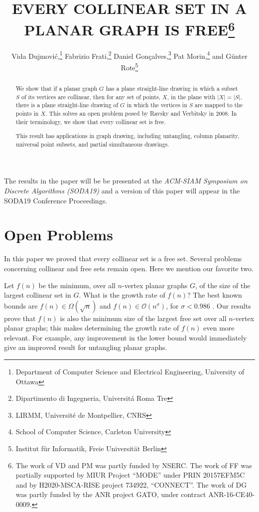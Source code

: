 \documentclass{patmorin}
\title{\MakeUppercase{Every Collinear Set in a Planar Graph Is Free}\thanks{%
    The work of VD and PM was partly funded by NSERC.
    The work of FF was 
partially supported by MIUR Project “MODE” under PRIN 20157EFM5C and by 
H2020-MSCA-RISE project 734922, “CONNECT”.
    The work of DG  was 
partly funded by the ANR project GATO, under contract
     ANR-16-CE40-0009.}}
\author{Vida Dujmovi\'c,\thanks{Department of Computer Science and Electrical Engineering, University of Ottawa}\quad
        Fabrizio Frati,\thanks{Dipartimento di Ingegneria, Universit\'a Roma Tre}\quad 
        Daniel Gon\c{c}alves,\thanks{LIRMM, Université de Montpellier, CNRS}\quad
        Pat Morin,\thanks{School of Computer Science, Carleton University}\quad 
        and G\"unter Rote\thanks{Institut f\"ur Informatik, Freie Universit\"at Berlin}}
\newif\ifSODA
\begin{document}
\begin{titlepage}
\maketitle

\begin{abstract}
  We show that if a planar graph $G$ has a plane straight-line drawing in
  which a subset $S$ of its vertices are collinear, then for any set of
  points, $X$, in the plane with $|X|=|S|$, there is a plane straight-line
  drawing of $G$ in which the vertices in $S$ are mapped to the points
  in $X$.  This solves an open problem posed by Ravsky and Verbitsky in
  2008.  In their terminology, we show that every collinear set is free.

  This result has applications in graph drawing, including untangling,
  column planarity, universal point subsets, and partial simultaneous
  drawings.
\end{abstract}
\ifSODA
\else
The results in the paper will be be presented at the \emph{ACM-SIAM
Symposium on Discrete Algorithms (SODA19)} and a version of this paper
will appear in the SODA19 Conference Proceedings.
\fi
\end{titlepage}


\tableofcontents

\newpage
{}







\section{Open Problems}

In this paper we proved that every collinear set is a free set. Several problems concerning collinear and free sets remain open. Here we mention our favorite two.

Let $f(n)$ be the minimum, over all $n$-vertex planar graphs $G$, of the size of the largest collinear set in $G$. What is the growth rate of $f(n)$? The best known bounds are $f(n)\in\Omega(\sqrt{n})$ and $f(n)\in \mathcal{O}(n^\sigma)$, for $\sigma < 0.986$ \cite{bose.dujmovic.ea:polynomial,ravsky.verbitsky:on}. Our results prove that $f(n)$ is also the minimum size of the largest free set over all $n$-vertex planar graphs; this makes determining the growth rate of $f(n)$ even more relevant. For example, any improvement in the lower bound would immediately give an improved result for untangling planar graphs.
%
\end{document}
